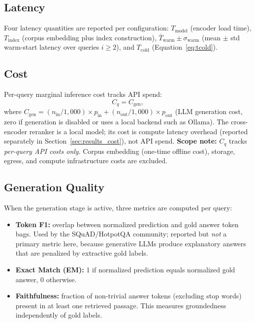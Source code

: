 \documentclass[11pt,a4paper]{article}
\begin{document}
\subsection{Latency}

Four latency quantities are reported per configuration:
$T_{\mathrm{model}}$ (encoder load time),
$T_{\mathrm{index}}$ (corpus embedding plus index construction),
$\bar{T}_{\mathrm{warm}} \pm \sigma_{\mathrm{warm}}$ (mean $\pm$ std warm-start
latency over queries $i \geq 2$), and $T_{\mathrm{cold}}$
(Equation~\eqref{eq:tcold}).

\subsection{Cost}

Per-query marginal inference cost tracks API spend:
\begin{equation}
  C_q = C_{\mathrm{gen}},
  \label{eq:cost}
\end{equation}
where $C_{\mathrm{gen}} = (n_{\mathrm{in}}/1{,}000) \times p_{\mathrm{in}} +
(n_{\mathrm{out}}/1{,}000) \times p_{\mathrm{out}}$ (LLM generation cost, zero
if generation is disabled or uses a local backend such as Ollama).
The cross-encoder reranker is a local model; its cost is compute latency
overhead (reported separately in Section~\ref{sec:results_cost}), not API spend.
\textbf{Scope note:} $C_q$ tracks \emph{per-query API costs only}.
Corpus embedding (one-time offline cost), storage, egress, and compute
infrastructure costs are excluded.

\subsection{Generation Quality}
\label{sec:gen_metrics}

When the generation stage is active, three metrics are computed per query:

\begin{itemize}[leftmargin=*,topsep=2pt,itemsep=1pt]
  \item \textbf{Token F1:} overlap between normalized prediction and gold
        answer token bags.
        Used by the SQuAD/HotpotQA community; reported but \emph{not} a primary
        metric here, because generative LLMs produce explanatory answers that
        are penalized by extractive gold labels.
  \item \textbf{Exact Match (EM):} 1 if normalized prediction equals
        normalized gold answer, 0 otherwise.
  \item \textbf{Faithfulness:} fraction of non-trivial answer tokens
        (excluding stop words) present in at least one retrieved passage.
        This measures groundedness independently of gold labels.
\end{itemize}
\end{document}
